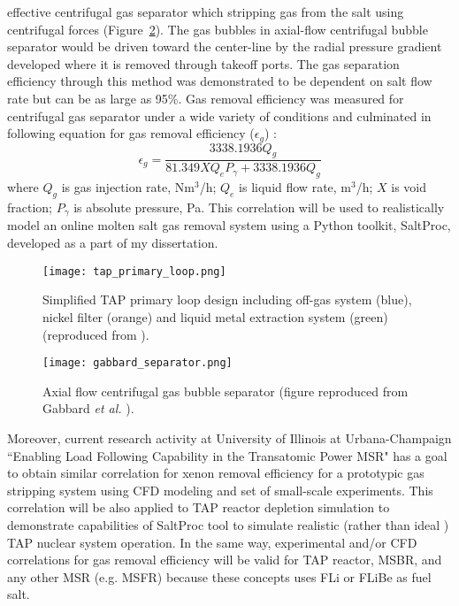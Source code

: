 effective centrifugal gas separator which stripping gas from the salt using 
centrifugal forces (Figure~\ref{fig:gabbard-separator}). The gas bubbles in 
axial-flow centrifugal bubble 
separator would be driven toward the center-line by the radial pressure gradient 
developed where it is removed through takeoff ports. The gas 
separation efficiency through this method was demonstrated to be dependent on 
salt flow rate but can be as large as 95\%. Gas removal efficiency was 
measured for centrifugal gas separator
under a wide variety of conditions and culminated in following equation for 
gas removal efficiency ($\epsilon_{g}$) \cite{gabbard_development_1974}:
\begin{equation} \label{eq:gas_eff}
\epsilon_g = \frac{3338.1936 Q_g}{81.349 X Q_e P_{\gamma} + 3338.1936 Q_g}
\end{equation}
where $Q_g$ is gas injection rate, Nm$^3$/h; 
$Q_e$ is liquid flow rate, m$^3$/h; 
$X$ is void fraction; $P_{\gamma}$ is absolute pressure, Pa. This correlation will 
be used to realistically model an online molten salt gas removal system using 
a Python toolkit, SaltProc, developed as a part of my dissertation.
\begin{figure}[htp!] %
  \centering
		  \texttt{[image: tap\_primary\_loop.png]}
  \caption{Simplified \gls{TAP} primary loop design including off-gas system (blue), 
  nickel filter (orange) and liquid metal extraction system (green) (reproduced from \cite{transatomic_power_transatomic_2019}).}
  \label{fig:tap-reproc}
\end{figure}
\begin{figure}[htp!] %
  \centering
		  \texttt{[image: gabbard\_separator.png]}
  \caption{Axial flow centrifugal gas bubble separator (figure reproduced 
  from Gabbard \emph{et al.} \cite{gabbard_development_1974}).}
  \label{fig:gabbard-separator}
\end{figure}

Moreover, current research activity at University of Illinois at Urbana-Champaign 
``Enabling Load Following Capability in the Transatomic Power MSR" has a goal 
to obtain similar correlation for xenon removal efficiency for a prototypic 
gas stripping system using CFD modeling and set of small-scale experiments. This 
correlation will be also applied to \gls{TAP} reactor depletion simulation to 
demonstrate capabilities of SaltProc tool to simulate realistic (rather than ideal 
\cite{transatomic_power_corporation_neutronics_2016, 
betzler_two-dimensional_2016,  betzler_assessment_2017}) \gls{TAP} nuclear 
system operation. In the same way, experimental and/or CFD correlations for gas  
removal efficiency will be valid for \gls{TAP} reactor, \gls{MSBR}, and any other 
\gls{MSR} 
(e.g. \gls{MSFR}) because these concepts uses FLi or FLiBe as fuel salt.

